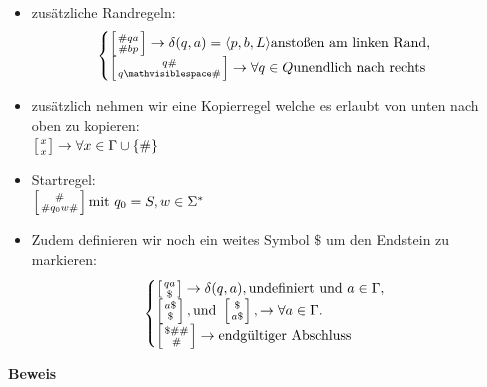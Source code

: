 \documentclass[12pt,a4paper]{article}
\begin{document}
\begin{itemize}
$$$$
\item zusätzliche Randregeln:$$
\begin{cases}
\left[ {\# qa \atop \# bp} \right] \rightarrow \delta(q, a) = \langle p, b, L \rangle \text{anstoßen am linken Rand},\\
\left[ {q \# \atop q \mathvisiblespace \# } \right] \rightarrow \forall q \in Q \text{unendlich nach rechts}\\
\end{cases}
$$
\item zusätzlich nehmen wir eine Kopierregel welche es erlaubt von unten nach oben zu kopieren:\\
$\left[ {x \atop x} \right] \rightarrow \forall x \in \Gamma \cup \{ \# \}$
\item Startregel:\\
$ \left[ {\# \atop \# q_0 w \#} \right] \text{mit } q_0 = S, w \in \Sigma^*$
\item Zudem definieren wir noch ein weites Symbol $ \$ $ um den Endstein zu markieren:$$
\begin{cases}
\left[ {qa \atop \$} \right] \rightarrow \delta(q, a), \text{undefiniert und } a\in \Gamma,\\
\left[ {a\$ \atop \$} \right], \text{und } \left[ {\$ \atop a\$} \right], \rightarrow \forall a \in \Gamma.\\
\left[ {\$ \# \# \atop \#} \right] \rightarrow \text{endgültiger Abschluss}
\end{cases}
$$
\end{itemize}
\textbf{Beweis}
\end{document}
